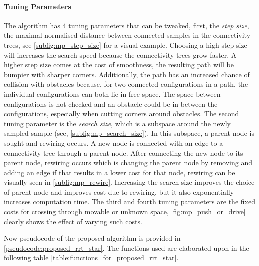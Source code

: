 \paragraph{Tuning Parameters}
The algorithm has 4 tuning parameters that can be tweaked, first, the \textit{step size}, the maximal normalised distance between connected samples in the connectivity trees, see \cref{subfig:mp_step_size} for a visual example. Choosing a high step size will increases the search speed because the connectivity trees grow faster. A higher step size comes at the cost of smoothness, the resulting path will be bumpier with sharper corners. Additionally, the path has an increased chance of collision with obstacles because, for two connected configurations in a path, the individual configurations can both lie in free space. The space between configurations is not checked and an obstacle could be in between the configurations, especially when cutting corners around obstacles. The second tuning parameter is the \textit{search size}, which is a subspace around the newly sampled sample (see, \cref{subfig:mp_search_size}). In this subspace, a parent node is sought and rewiring occurs. A new node is connected with an edge to a connectivity tree through a parent node. After connecting the new node to its parent node, rewiring occurs which is changing the parent node by removing and adding an edge if that results in a lower cost for that node, rewiring can be visually seen in \cref{subfig:mp_rewire}. Increasing the search size improves the choice of parent node and improves cost due to rewiring, but it also exponentially increases computation time. The third and fourth tuning parameters are the fixed costs for crossing through movable or unknown space, \cref{fig:mp_push_or_drive} clearly shows the effect of varying such costs.\bs

Now pseudocode of the proposed algorithm is provided in \cref{pseudocode:proposed_rrt_star}. The functions used are elaborated upon in the following table \cref{table:functions_for_proposed_rrt_star}.\bs

